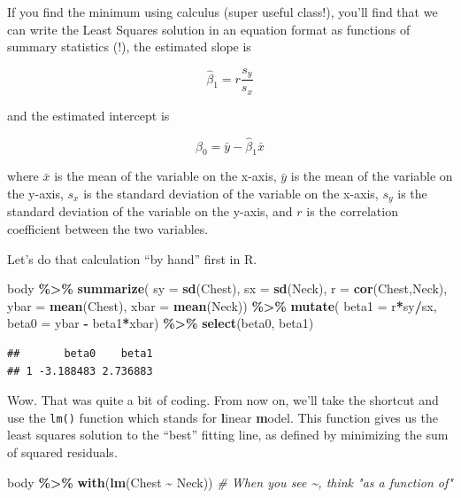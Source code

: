 \documentclass[
]{book}
\newenvironment{Shaded}{\begin{snugshade}}{\end{snugshade}}
\newcommand{\AttributeTok}[1]{\textcolor[rgb]{0.13,0.29,0.53}{#1}}
\newcommand{\CommentTok}[1]{\textcolor[rgb]{0.56,0.35,0.01}{\textit{#1}}}
\newcommand{\FunctionTok}[1]{\textcolor[rgb]{0.13,0.29,0.53}{\textbf{#1}}}
\newcommand{\NormalTok}[1]{#1}
\newcommand{\SpecialCharTok}[1]{\textcolor[rgb]{0.81,0.36,0.00}{\textbf{#1}}}
\begin{document}
If you find the minimum using calculus (super useful class!), you'll find that we can write the Least Squares solution in an equation format as functions of summary statistics (!), the estimated slope is

\[ \hat{\beta}_1  = r\frac{s_y}{s_x}\]

and the estimated intercept is

\[ \hat{\beta}_0 = \bar{y} - \hat{\beta}_1\bar{x} \]

where \(\bar{x}\) is the mean of the variable on the x-axis, \(\bar{y}\) is the mean of the variable on the y-axis, \(s_x\) is the standard deviation of the variable on the x-axis, \(s_y\) is the standard deviation of the variable on the y-axis, and \(r\) is the correlation coefficient between the two variables.

Let's do that calculation ``by hand'' first in R.

\begin{Shaded}
\begin{Highlighting}[]
\NormalTok{body }\SpecialCharTok{\%\textgreater{}\%}
    \FunctionTok{summarize}\NormalTok{(}
      \AttributeTok{sy =} \FunctionTok{sd}\NormalTok{(Chest), }
      \AttributeTok{sx =} \FunctionTok{sd}\NormalTok{(Neck), }
      \AttributeTok{r =} \FunctionTok{cor}\NormalTok{(Chest,Neck), }
      \AttributeTok{ybar =} \FunctionTok{mean}\NormalTok{(Chest), }
      \AttributeTok{xbar =} \FunctionTok{mean}\NormalTok{(Neck)) }\SpecialCharTok{\%\textgreater{}\%}
    \FunctionTok{mutate}\NormalTok{(}
      \AttributeTok{beta1 =}\NormalTok{ r}\SpecialCharTok{*}\NormalTok{sy}\SpecialCharTok{/}\NormalTok{sx, }
      \AttributeTok{beta0 =}\NormalTok{ ybar }\SpecialCharTok{{-}}\NormalTok{ beta1}\SpecialCharTok{*}\NormalTok{xbar) }\SpecialCharTok{\%\textgreater{}\%}
    \FunctionTok{select}\NormalTok{(beta0, beta1)}
\end{Highlighting}
\end{Shaded}

\begin{verbatim}
##       beta0    beta1
## 1 -3.188483 2.736883
\end{verbatim}

Wow. That was quite a bit of coding. From now on, we'll take the shortcut and use the \texttt{lm()} function which stands for \textbf{l}inear \textbf{m}odel. This function gives us the least squares solution to the ``best'' fitting line, as defined by minimizing the sum of squared residuals.

\begin{Shaded}
\begin{Highlighting}[]
\NormalTok{body }\SpecialCharTok{\%\textgreater{}\%} \FunctionTok{with}\NormalTok{(}\FunctionTok{lm}\NormalTok{(Chest }\SpecialCharTok{\textasciitilde{}}\NormalTok{ Neck)) }\CommentTok{\# When you see \textasciitilde{}, think "as a function of"}
\end{Highlighting}
\end{Shaded}
\end{document}
